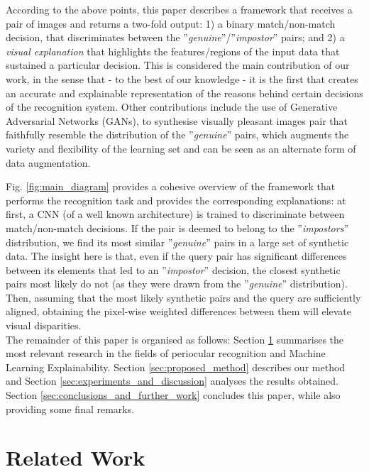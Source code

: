 \documentclass[final]{cvpr}
\begin{document}
According to the above points, this paper describes a framework that receives a pair of images and returns a two-fold output: 1) a binary match/non-match decision, that discriminates between the ''\emph{genuine}''/''\emph{impostor}'' pairs; and 2) a \emph{visual explanation} that highlights the features/regions of the input data that sustained a particular decision. This is considered the main contribution of our work, in the sense that - to the best of our knowledge - it is the first that creates an accurate and explainable representation of the reasons behind certain decisions of the recognition system. Other contributions include the use of Generative Adversarial Networks (GANs), to synthesise visually pleasant images pair that faithfully resemble the distribution of the ''\emph{genuine}'' pairs, which augments the variety and flexibility  of the learning set and can be seen as an alternate form of data augmentation.

Fig. \ref{fig:main_diagram} provides a cohesive overview of the framework that performs the  recognition task and provides the corresponding explanations: at first, a CNN (of a well known architecture) is trained to discriminate between match/non-match decisions. If the pair is deemed to belong to the ''\emph{impostors}'' distribution, we find its most similar ''\emph{genuine}'' pairs in a large set of synthetic data. The insight here is that, even if the query pair has significant differences between its elements that led to an ''\emph{impostor}'' decision, the closest synthetic pairs most likely do not (as they were  drawn from the ''\emph{genuine}'' distribution). Then, assuming that the most likely synthetic pairs and the query are sufficiently aligned, obtaining the pixel-wise weighted differences between them will elevate visual disparities. \\

The remainder of this paper is organised as follows: Section \ref{sec:related_work} summarises the most relevant research  in the fields of periocular recognition and Machine Learning Explainability. Section \ref{sec:proposed_method} describes our method and Section \ref{sec:experiments_and_discussion} analyses the results obtained. Section \ref{sec:conclusions_and_further_work} concludes this paper, while also providing some final remarks.


\section{Related Work}
\label{sec:related_work}
\end{document}
